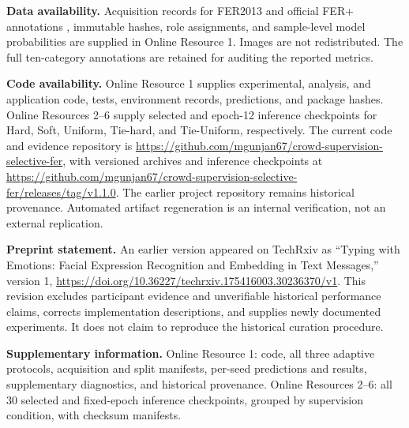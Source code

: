 \documentclass[pdflatex,sn-mathphys-num]{sn-jnl}
\begin{document}
\noindent\textbf{Data availability.} Acquisition records for FER2013 \cite{goodfellow2013fer} and official FER+ annotations \cite{barsoum2016ferplus}, immutable hashes, role assignments, and sample-level model probabilities are supplied in Online Resource 1. Images are not redistributed. The full ten-category annotations are retained for auditing the reported metrics.

\noindent\textbf{Code availability.} Online Resource 1 supplies experimental, analysis, and application code, tests, environment records, predictions, and package hashes. Online Resources 2--6 supply selected and epoch-12 inference checkpoints for Hard, Soft, Uniform, Tie-hard, and Tie-Uniform, respectively. The current code and evidence repository is \url{https://github.com/mgunjan67/crowd-supervision-selective-fer}, with versioned archives and inference checkpoints at \url{https://github.com/mgunjan67/crowd-supervision-selective-fer/releases/tag/v1.1.0}. The earlier project repository remains historical provenance. Automated artifact regeneration is an internal verification, not an external replication.

\noindent\textbf{Preprint statement.} An earlier version appeared on TechRxiv as ``Typing with Emotions: Facial Expression Recognition and Embedding in Text Messages,'' version 1, \url{https://doi.org/10.36227/techrxiv.175416003.30236370/v1}. This revision excludes participant evidence and unverifiable historical performance claims, corrects implementation descriptions, and supplies newly documented experiments. It does not claim to reproduce the historical curation procedure.

\noindent\textbf{Supplementary information.} Online Resource 1: code, all three adaptive protocols, acquisition and split manifests, per-seed predictions and results, supplementary diagnostics, and historical provenance. Online Resources 2--6: all 30 selected and fixed-epoch inference checkpoints, grouped by supervision condition, with checksum manifests.


\end{document}
